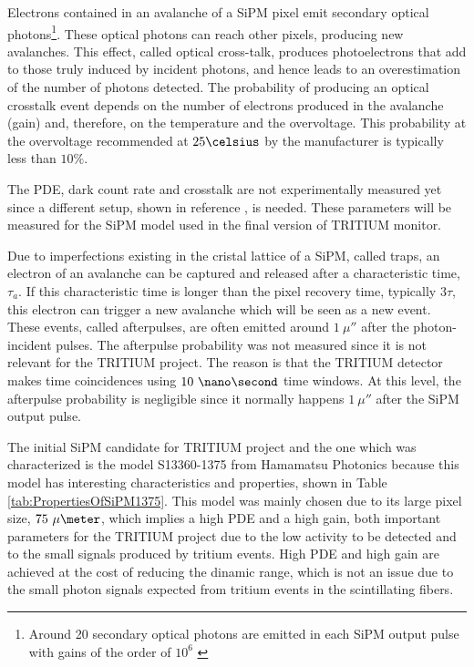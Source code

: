 Electrons contained in an avalanche of a SiPM pixel emit secondary optical photons\footnote{Around 20 secondary optical photons are emitted in each SiPM output pulse with gains of the order of $10^6$ \cite{CrosstalkProbability}}. These optical photons can reach other pixels, producing new avalanches. This effect, called optical cross-talk, produces photoelectrons that add to those truly induced by incident photons, and hence leads to an overestimation of the number of photons detected. The probability of producing an optical crosstalk event depends on the number of electrons produced in the avalanche (gain) and, therefore, on the temperature and the overvoltage. This probability at the overvoltage recommended at $25\celsius$ by the manufacturer is typically less than $10\%$.

The PDE, dark count rate and crosstalk are not experimentally measured yet since a different setup, shown in reference \cite{PDEStudy}, is needed. These parameters will be measured for the SiPM model used in the final version of TRITIUM monitor.

Due to imperfections existing in the cristal lattice of a SiPM, called traps, an electron of an avalanche can be captured and released after a characteristic time, $\tau_a$. If this characteristic time is longer than the pixel recovery time, typically $3\tau$, this electron can trigger a new avalanche which will be seen as a new event. These events, called  afterpulses, are often emitted around $1~\mu\second$ after the photon-incident pulses. The afterpulse probability was not measured since it is not relevant for the TRITIUM project. The reason is that the TRITIUM detector makes time coincidences using $10~\nano\second$ time windows. At this level, the afterpulse probability is negligible since it normally happens $1~\mu\second$ after the SiPM output pulse.

The initial SiPM candidate for TRITIUM project and the one which was characterized is the model S13360-1375 from Hamamatsu Photonics \cite{DataSheetHammamatsu_1_SiPM_1375} because this model has interesting characteristics and properties, shown in Table \ref{tab:PropertiesOfSiPM1375}. This model was mainly chosen due to its large pixel size, $75~\mu\meter$, which implies a high PDE and a high gain, both important parameters for the TRITIUM project due to the low activity to be detected and to the small signals produced by tritium events. High PDE and high gain are achieved at the cost of reducing the dinamic range, which is not an issue due to the small photon signals expected from tritium events in the scintillating fibers. 

